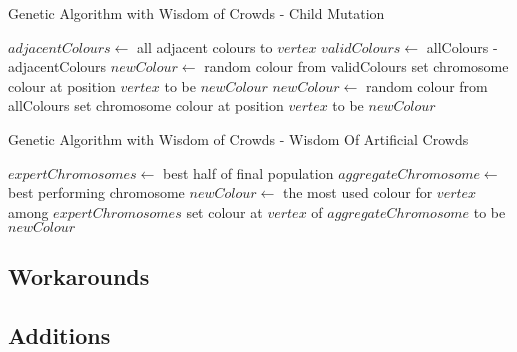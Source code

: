 \begin{algorithm}
\begin{algorithmic}[1]
\caption{Genetic Algorithm with Wisdom of Crowds - Child Mutation}
			\State $adjacentColours \gets$ all adjacent colours to $vertex$
			\State $validColours \gets$ allColours - adjacentColours
			\State $newColour \gets$ random colour from validColours
			\State set chromosome colour at position $vertex$ to be $newColour$
			\EndIf
		\EndFor
	\EndProcedure
	\linebreak
	\setcounter{ALG@line}{0}
				\State $newColour \gets$ random colour from allColours
				\State set chromosome colour at position $vertex$ to be $newColour$
			\EndIf
		\EndFor
	\EndProcedure
\end{algorithmic}
\end{algorithm}

\begin{algorithm}
\begin{algorithmic}[1]
\caption{Genetic Algorithm with Wisdom of Crowds - Wisdom Of Artificial Crowds}
		\State $expertChromosomes \gets$ best half of final population
		\State $aggregateChromosome \gets$ best performing chromosome
				\State $newColour \gets$ the most used colour for $vertex$ among $expertChromosomes$
				\State set colour at $vertex$ of $aggregateChromosome$ to be $newColour$
			\EndIf
		\EndFor
	\EndProcedure
\end{algorithmic}
\end{algorithm}

\subsection{Workarounds}
\subsection{Additions}
\label{genAdditions}